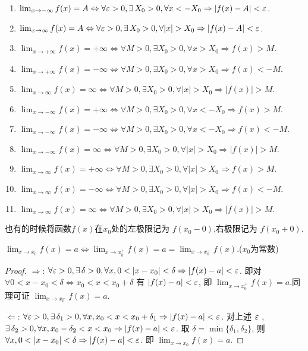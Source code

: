 \begin{enumerate}[(1)]
    \item $\lim_{x \to -\infty} f(x) = A \Leftrightarrow \forall \ve >0, \exists X_0 >0, \forall x<-X_0 \Rightarrow |f(x)-A|<\ve$.
    \item $\lim_{x \to \infty} f(x) = A \Leftrightarrow \forall \ve >0, \exists X_0 >0, \forall |x|>X_0 \Rightarrow |f(x)-A|<\ve$.
    \item $\lim_{x \to +\infty} f(x) = +\infty \Leftrightarrow \forall M>0, \exists X_0 >0, \forall x>X_0 \Rightarrow f(x)>M$.
    \item $\lim_{x \to +\infty} f(x) = -\infty \Leftrightarrow \forall M>0, \exists X_0 >0, \forall x>X_0 \Rightarrow f(x)<-M$.
    \item $\lim_{x \to \infty} f(x) = \infty \Leftrightarrow \forall M>0, \exists X_0 >0, \forall |x|>X_0 \Rightarrow |f(x)|>M$.
    \item $\lim_{x \to -\infty} f(x) = +\infty \Leftrightarrow \forall M>0, \exists X_0 >0, \forall x<-X_0 \Rightarrow f(x)>M$.
    \item $\lim_{x \to -\infty} f(x) = -\infty \Leftrightarrow \forall M>0, \exists X_0 >0, \forall x<-X_0 \Rightarrow f(x)<-M$.
    \item $\lim_{x \to -\infty} f(x) = \infty \Leftrightarrow \forall M>0, \exists X_0 >0, \forall |x|>X_0 \Rightarrow |f(x)|>M$.
    \item $\lim_{x \to \infty} f(x) = +\infty \Leftrightarrow \forall M>0, \exists X_0 >0, \forall |x|>X_0 \Rightarrow f(x)>M$.
    \item $\lim_{x \to \infty} f(x) = -\infty \Leftrightarrow \forall M>0, \exists X_0 >0, \forall |x|>X_0 \Rightarrow f(x)<-M$.
    \item $\lim_{x \to \infty} f(x) = \infty \Leftrightarrow \forall M>0, \exists X_0 >0, \forall |x|>X_0 \Rightarrow |f(x)|>M$.
\end{enumerate}

\begin{remark}
    也有的时候将函数$f(x)$在$x_0$处的左极限记为 $f(x_0 - 0)$,右极限记为 $f(x_0 + 0)$.
\end{remark}

\begin{theorem}
    $\lim _{x \to x_0} f(x) = a \Leftrightarrow \lim _{x \to x_0^+} f(x) = a = \lim _{x \to x_0^-} f(x)$.($x_0$为常数)
\end{theorem}

\begin{proof}
    $\Rightarrow$:
    $\forall \ve >0, \exists \delta >0, \forall x, 0<|x-x_0|<\delta \Rightarrow |f(x)-a|<\ve$. 即对 $ \forall 0 < x - x_0 <\delta \Leftrightarrow x_0 < x < x_0 + \delta$ 有 $|f(x)-a|<\varepsilon$, 即 $\lim _{x \to x_0^+} f(x) = a$.同理可证 $\lim _{x \to x_0^-} f(x) = a$.

    $\Leftarrow$:
    $\forall \ve > 0 , \exists \delta_1 > 0, \forall x, x_0 < x < x_0 + \delta_1 \Rightarrow |f(x) - a| < \ve$.
    对上述 $\varepsilon$ , $\exists \delta_2 > 0, \forall x, x_0 - \delta_2 < x < x_0 \Rightarrow |f(x) - a| < \ve$. 取 $\delta = \min\{\delta_1, \delta_2\}$, 则 $\forall x, 0 < |x - x_0| < \delta \Rightarrow |f(x) - a| < \varepsilon$. 即 $\lim _{x \to x_0} f(x) = a$.
\end{proof}

